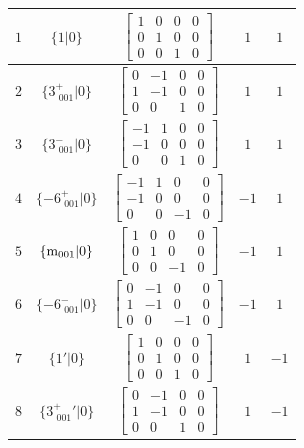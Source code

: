 \documentclass[fleqn,8pt]{jsarticle}
\begin{document}
\begin{longtable}{ccccc}
$ 1 $ & $ \{1|0\} $ & $ \begin{bmatrix} 1 & 0 & 0 & 0 \\ 0 & 1 & 0 & 0 \\ 0 & 0 & 1 & 0 \end{bmatrix} $ & $ 1 $ & $ 1 $ \\ \hline
$ 2 $ & $ \{3^{+}_{\,\,001}|0\} $ & $ \begin{bmatrix} 0 & -1 & 0 & 0 \\ 1 & -1 & 0 & 0 \\ 0 & 0 & 1 & 0 \end{bmatrix} $ & $ 1 $ & $ 1 $ \\ \hline
$ 3 $ & $ \{3^{-}_{\,\,001}|0\} $ & $ \begin{bmatrix} -1 & 1 & 0 & 0 \\ -1 & 0 & 0 & 0 \\ 0 & 0 & 1 & 0 \end{bmatrix} $ & $ 1 $ & $ 1 $ \\ \hline
$ 4 $ & $ \{-6^{+}_{\,\,001}|0\} $ & $ \begin{bmatrix} -1 & 1 & 0 & 0 \\ -1 & 0 & 0 & 0 \\ 0 & 0 & -1 & 0 \end{bmatrix} $ & $ -1 $ & $ 1 $ \\ \hline
$ 5 $ & $ \{{\rm m}_{001}|0\} $ & $ \begin{bmatrix} 1 & 0 & 0 & 0 \\ 0 & 1 & 0 & 0 \\ 0 & 0 & -1 & 0 \end{bmatrix} $ & $ -1 $ & $ 1 $ \\ \hline
$ 6 $ & $ \{-6^{-}_{\,\,001}|0\} $ & $ \begin{bmatrix} 0 & -1 & 0 & 0 \\ 1 & -1 & 0 & 0 \\ 0 & 0 & -1 & 0 \end{bmatrix} $ & $ -1 $ & $ 1 $ \\ \hline
$ 7 $ & $ \{1{}'|0\} $ & $ \begin{bmatrix} 1 & 0 & 0 & 0 \\ 0 & 1 & 0 & 0 \\ 0 & 0 & 1 & 0 \end{bmatrix} $ & $ 1 $ & $ -1 $ \\ \hline
$ 8 $ & $ \{3^{+}_{\,\,001}{}'|0\} $ & $ \begin{bmatrix} 0 & -1 & 0 & 0 \\ 1 & -1 & 0 & 0 \\ 0 & 0 & 1 & 0 \end{bmatrix} $ & $ 1 $ & $ -1 $ \\ \hline

\end{longtable}
\end{document}

